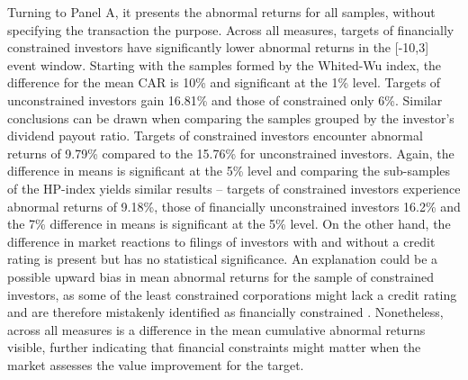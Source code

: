 \documentclass[12pt]{article}
\begin{document}
Turning to Panel A, it presents the abnormal returns for all samples, without specifying the transaction the purpose. Across all measures, targets of financially constrained investors have significantly lower abnormal returns in the [-10,3] event window. Starting with the samples formed by the Whited-Wu index, the difference for the mean CAR is 10\% and significant at the 1\% level. Targets of unconstrained investors gain 16.81\% and those of constrained only 6\%. Similar conclusions can be drawn when comparing the samples grouped by the investor's dividend payout ratio. Targets of constrained investors encounter abnormal returns of 9.79\% compared to the 15.76\% for unconstrained investors. Again, the difference in means is significant at the 5\% level and comparing the sub-samples of the HP-index yields similar results -- targets of constrained investors experience abnormal returns of 9.18\%, those of financially unconstrained investors 16.2\% and the 7\% difference in means is significant at the 5\% level. On the other hand, the difference in market reactions to filings of investors with and without a credit rating is present but has no statistical significance. An explanation could be a possible upward bias in mean abnormal returns for the sample of constrained investors, as some of the least constrained corporations might lack a credit rating and are therefore mistakenly identified as financially constrained \citep[p.18]{heller2015}.
Nonetheless, across all measures is a difference in the mean cumulative abnormal returns visible, further indicating that financial constraints might  matter when the market assesses the value improvement for the target. 
 
\end{document}
